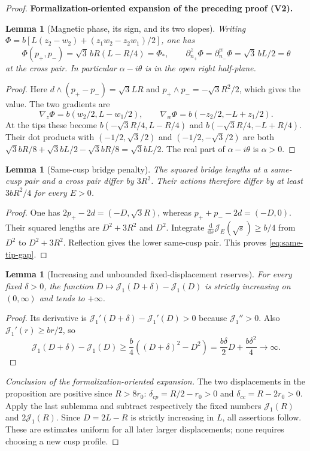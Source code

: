 \documentclass[11pt]{article}
\newtheorem{lemma}[theorem]{Lemma}
\newcommand{\formalisationparentid}{X}
\newenvironment{formalisationaddition}[1]{\par\medskip\begingroup\color{blue}\def\formalisationparentid{#1}\setcounter{formalizationsublemma}{0}\let\lemma\formalizationsublemma\let\endlemma\endformalizationsublemma
  \def\Eo{\mathcal E_h^\circ}\def\EE{\mathcal E_h}\def\phio{\phi_h^\circ}\def\phih{\phi_h}\def\Ho{H_h^{\rm atom}(v^\circ)}\def\Ha{H_h^{\rm atom}}\def\HL{H_h^{L}}\def\Dh{D_h}\def\Log{\operatorname{Log}}\def\ellh{\ell_h}\def\Gp{G_{p,h}}\def\Ast{A_{*,h}}\def\ahat{\widehat{\mathfrak a}_h}\def\ah{\mathfrak a_h}\def\rh{\widehat\rho_h}\def\deltah{\widehat\delta_h}\def\oldref##1{\textup{(##1)}}\def\interface##1{\par\noindent\textit{Analytical interface used here.} ##1\par}\def\finish{\par\noindent\textit{Conclusion of the formalization-oriented expansion.} }\par\noindent\textbf{Formalization-oriented expansion of the preceding proof (V2).}\par\smallskip
}{\par\endgroup\medskip
}
\newcommand{\cJ}{\mathcal J}
\begin{document}
\begin{proof}
\begin{formalisationaddition}{P2.6}
\begin{lemma}[Magnetic phase, its sign, and its two slopes]\label{sublemma:P2-6-phase-calculation}
Writing $\Phi=b[L(z_2-w_2)+(z_1w_2-z_2w_1)/2]$, one has
\[
 \Phi(p_+,p_-)=\sqrt3\,bR(L-R/4)=\Phi_*,\qquad
 \partial_{n_+}^{z}\Phi=\partial_{n_-}^{w}\Phi=\sqrt3\,bL/2=\theta
\]
at the cross pair. In particular $\alpha-i\theta$ is in the open right half-plane.
\end{lemma}
\begin{proof}
Here $d\wedge(p_+-p_-)=\sqrt3LR$ and
$p_+\wedge p_-=-\sqrt3R^2/2$, which gives the value.
The two gradients are
\[
 \nabla_z\Phi=b(w_2/2,L-w_1/2),\qquad
 \nabla_w\Phi=b(-z_2/2,-L+z_1/2).
\]
At the tips these become $b(-\sqrt3R/4,L-R/4)$ and
$b(-\sqrt3R/4,-L+R/4)$. Their dot products with
$(-1/2,\sqrt3/2)$ and $(-1/2,-\sqrt3/2)$ are both
$\sqrt3bR/8+\sqrt3bL/2-\sqrt3bR/8=\sqrt3bL/2$.
The real part of $\alpha-i\theta$ is $\alpha>0$.
\end{proof}

\begin{lemma}[Same-cusp bridge penalty]\label{sublemma:P2-6-same-cusp}
The squared bridge lengths at a same-cusp pair and a cross pair differ by $3R^2$. Their actions therefore differ by at least $3bR^2/4$ for every $E>0$.
\end{lemma}
\begin{proof}
One has $2p_+-2d=(-D,\sqrt3R)$, whereas $p_++p_--2d=(-D,0)$. Their squared lengths are $D^2+3R^2$ and $D^2$. Integrate
$\frac{\mathrm d}{\mathrm ds}\cJ_E(\sqrt s)\ge b/4$ from $D^2$ to $D^2+3R^2$. Reflection gives the lower same-cusp pair. This proves \eqref{eq:same-tip-gap}.
\end{proof}

\begin{lemma}[Increasing and unbounded fixed-displacement reserves]\label{sublemma:P2-6-displacement}
For every fixed $\delta>0$, the function
$D\mapsto \cJ_1(D+\delta)-\cJ_1(D)$ is strictly increasing on $(0,\infty)$ and tends to $+\infty$.
\end{lemma}
\begin{proof}
Its derivative is $\cJ_1'(D+\delta)-\cJ_1'(D)>0$ because $\cJ_1''>0$. Also $\cJ_1'(r)\ge br/2$, so
\[
 \cJ_1(D+\delta)-\cJ_1(D)\ge\frac b4((D+\delta)^2-D^2)
 =\frac{b\delta}{2}D+\frac{b\delta^2}{4}\longrightarrow\infty.
\]
\end{proof}
\finish The two displacements in the proposition are positive since $R>8r_0$: $\delta_{cp}=R/2-r_0>0$ and $\delta_{cc}=R-2r_0>0$. Apply the last sublemma and subtract respectively the fixed numbers $\cJ_1(R)$ and $2\cJ_1(R)$. Since $D=2L-R$ is strictly increasing in $L$, all assertions follow. These are estimates uniform for all later larger displacements; none requires choosing a new cusp profile.
\end{formalisationaddition}

\end{proof}
\end{document}

